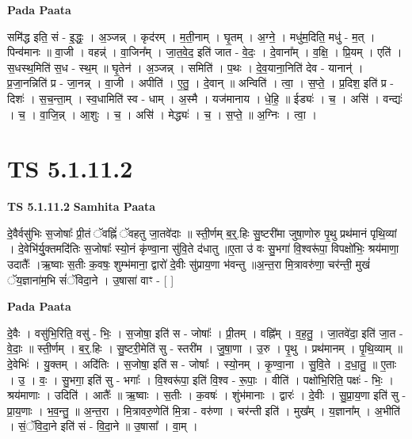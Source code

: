 \documentclass[17pt]{extarticle}
\begin{document}
\textbf{Pada Paata} \newline

समि॑द्ध इति॒ सं - इ॒द्धः॒ । अ॒ञ्जन्न् । कृद॑रम् । म॒ती॒नाम् । घृ॒तम् । अ॒ग्ने॒ । मधु॑म॒दिति॒ मधु॑ - म॒त् । पिन्व॑मानः ॥ वा॒जी । वहन्न्॑ । वा॒जिन᳚म् । जा॒त॒वे॒द॒ इति॑ जात - वे॒दः॒ । दे॒वाना᳚म् । व॒क्षि॒ । प्रि॒यम् । एति॑ । स॒धस्थ॒मिति॑ स॒ध - स्थ॒म् ॥ घृ॒तेन॑ । अ॒ञ्जन्न् । समिति॑ । प॒थः । दे॒व॒याना॒निति॑ देव - यानान्॑ । प्र॒जा॒नन्निति॑ प्र - जा॒नन्न् । वा॒जी । अपीति॑ । ए॒तु॒ । दे॒वान् ॥ अन्विति॑ । त्वा॒ । स॒प्ते॒ । प्र॒दिश॒ इति॑ प्र - दिशः॑ । स॒च॒न्ता॒म् । स्व॒धामिति॑ स्व - धाम् । अ॒स्मै । यज॑मानाय । धे॒हि॒ ॥ ईड्यः॑ । च॒ । असि॑ । वन्द्यः॑ । च॒ । वा॒जि॒न्न् । आ॒शुः । च॒ । असि॑ । मेद्ध्यः॑ । च॒ । स॒प्ते॒ ॥ अ॒ग्निः । त्वा॒ ।  \newline





\section{ TS 5.1.11.2 }

\textbf{TS 5.1.11.2 } \newline
\textbf{Samhita Paata} \newline

दे॒वैर्वसु॑भिः स॒जोषाः᳚ प्री॒तं ॅवह्निं॑ ॅवहतु जा॒तवे॑दाः ॥ स्ती॒र्णम् ब॒र्॒.हिः सु॒ष्टरी॑मा जुषा॒णोरु पृ॒थु प्रथ॑मानं पृथि॒व्यां । दे॒वेभि॑र्यु॒क्तमदि॑तिः स॒जोषाः᳚ स्यो॒नं कृ॑ण्वा॒ना सु॑वि॒ते द॑धातु ॥ए॒ता उ॑ वः सु॒भगा॑ वि॒श्वरू॑पा॒ विपक्षो॑भिः॒ श्रय॑माणा॒ उदातैः᳚ ।ऋ॒ष्वाः स॒तीः क॒वषः॒ शुम्भ॑माना॒ द्वारो॑ दे॒वीः सु॑प्राय॒णा भ॑वन्तु ॥अ॒न्त॒रा मि॒त्रावरु॑णा॒ चर॑न्ती॒ मुखं॑ ॅय॒ज्ञाना॑म॒भि सं॑ॅविदा॒ने । उ॒षासा॑ वाꣳ - [  ] \newline

\textbf{Pada Paata} \newline

दे॒वैः । वसु॑भि॒रिति॒ वसु॑ - भिः॒ । स॒जोषा॒ इति॑ स - जोषाः᳚ । प्री॒तम् । वह्नि᳚म् । व॒ह॒तु॒ । जा॒तवे॑दा॒ इति॑ जा॒त - वे॒दाः॒ ॥ स्ती॒र्णम् । ब॒र्॒.हिः । सु॒ष्टरी॒मेति॑ सु - स्तरी॑म । जु॒षा॒णा । उ॒रु । पृ॒थु । प्रथ॑मानम् । पृ॒थि॒व्याम् ॥ दे॒वेभिः॑ । यु॒क्तम् । अदि॑तिः । स॒जोषा॒ इति॑ स - जोषाः᳚ । स्यो॒नम् । कृ॒ण्वा॒ना । सु॒वि॒ते । द॒धा॒तु॒ ॥ ए॒ताः । उ॒ । वः॒ । सु॒भगा॒ इति॑ सु - भगाः᳚ । वि॒श्वरू॑पा॒ इति॑ वि॒श्व - रू॒पाः॒ । वीति॑ । पक्षो॑भि॒रिति॒ पक्षः॑ - भिः॒ । श्रय॑माणाः । उदिति॑ । आतैः᳚ ॥ ऋ॒ष्वाः । स॒तीः । क॒वषः॑ । शुंभ॑मानाः । द्वारः॑ । दे॒वीः । सु॒प्रा॒य॒णा इति॑ सु - प्रा॒य॒णाः । भ॒व॒न्तु॒ ॥ अ॒न्त॒रा । मि॒त्रावरु॒णेति॑ मि॒त्रा - वरु॑णा । चर॑न्ती इति॑ । मुख᳚म् । य॒ज्ञाना᳚म् । अ॒भीति॑ । सं॒ॅवि॒दा॒ने इति॑ सं - वि॒दा॒ने ॥ उ॒षासा᳚ । वा॒म् ।  \newline
\end{document}

